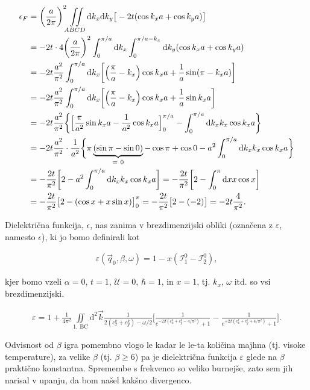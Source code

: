 \documentclass[a4paper, 12pt]{article}
\newcommand{\vq}{
	\ensuremath{\vec{q}}
}
\newcommand{\w}{
	\ensuremath{\omega}
}
\newcommand{\e}{
	\ensuremath{\epsilon}
}
\newcommand{\vk}{
	\ensuremath{\vec{k}}
}
\renewcommand{\ni}{
	\noindent
}
\newcommand{\dd}{
	\ensuremath{\text{d}}
}
\newcommand{\I}{
	\ensuremath{\mathcal{I}}
}
\begin{document}
\begin{align}
	\e_F &= \bigg(\frac{a}{2\pi}\bigg)^2 \iint\limits_{ABCD} \dd k_x \dd k_y \big[-2t (\cos k_x a + \cos k_y a)
		\big] \notag \\
	&= -2t \cdot 4 \bigg(\frac{a}{2\pi}\bigg)^2 \int_0^{\pi/a} \dd k_x \int_0^{\pi/a - k_x} \dd k_y (\cos k_x a +
		\cos k_y a) \notag \\
	&= -2t \frac{a^2}{\pi^2} \int_0^{\pi/a} \dd k_x \bigg[\Big(\frac{\pi}{a} - k_x\Big)\cos k_x a +
		\frac{1}{a}\sin(\pi - k_x a)\bigg] \notag \\
	&= -2t \frac{a^2}{\pi^2} \int_0^{\pi/a} \dd k_x \bigg[\Big(\frac{\pi}{a} - k_x\Big)\cos k_x a +
		\frac{1}{a}\sin k_x a \bigg] \notag \\
	&= -2t \frac{a^2}{\pi^2} \bigg\{\Big[\frac{\pi}{a^2}\sin k_x a - \frac{1}{a^2}\cos k_x a\Big]_0^{\pi/a} -
		\int_0^{\pi/a} \dd k_x k_x \cos k_x a\bigg\} \notag \\
	&= -2t \frac{a^2}{\pi^2} \cdot \frac{1}{a^2} \bigg\{\pi \underbrace{(\sin\pi - \sin 0)}_{=\ 0} - \cos\pi + \cos 0 - a^2
		\int_0^{\pi/a} \dd k_x k_x \cos k_x a\bigg\} \notag \\
	&= -\frac{2t}{\pi^2} \bigg[2 - a^2 \int_0^{\pi/a} \dd k_x k_x \cos k_x a\bigg] = -\frac{2t}{\pi^2}
		\bigg[2 - \int_0^\pi \dd x x \cos x\bigg] \notag \\
	&= -\frac{2t}{\pi^2}\big[2 - (\cos x + x\sin x)\big]_0^\pi = -\frac{2t}{\pi^2} \big[2 - (-2)\big] =
		-2t \frac{4}{\pi^2}.
\end{align}

Dielektri\v cna funkcija, $\e$, nas zanima v brezdimenzijski obliki (ozna\v cena z $\varepsilon$, namesto $\e$), ki jo bomo
definirali kot

\begin{align}
	\varepsilon (\vq_0, \beta, \w) = 1 - x (\I^0_1 - \I^0_2),
\end{align}

kjer bomo vzeli $\alpha = 0$, $t = 1$, $\mathcal{U} = 0$, $\hbar = 1$, in $x = 1$, tj. $k_x$, $\w$ itd. so vsi brezdimenzijski.

\begin{align}
	\varepsilon = 1 + \frac{1}{4\pi^2}\iint\limits_\text{1. BC} \dd^2 \vk \frac{1}{2(c_x^k + c_y^k) - \w/2}
		\bigg[\frac{1}{e^{-2\beta(c_x^k + c_y^k - 4/\pi^2)} + 1} - \frac{1}{e^{+2\beta(c_x^k + c_y^k + 4/\pi^2)} + 1}\bigg].
\end{align}

\ni Odvisnost od $\beta$ igra pomembno vlogo le kadar le le-ta koli\v cina majhna (tj. visoke temperature), za velike $\beta$ (tj. $\beta 
\geq 6$) pa je dielektri\v cna funkcija $\varepsilon$ glede na $\beta$ prakti\v cno konstantna. Spremembe s frekvenco so veliko
burnej\v se, zato sem jih narisal v upanju, da bom na\v sel kak\v sno divergenco.
\end{document}
